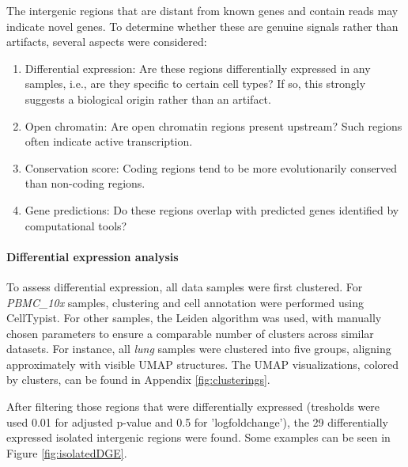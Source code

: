 The intergenic regions that are distant from known genes and contain reads may indicate novel genes.
To determine whether these are genuine signals rather than artifacts, several aspects were considered:
\begin{enumerate}
  \item Differential expression: Are these regions differentially expressed in any samples, i.e., are they specific to certain cell types?
  If so, this strongly suggests a biological origin rather than an artifact.
  \item Open chromatin: Are open chromatin regions present upstream? Such regions often indicate active transcription.
  \item Conservation score: Coding regions tend to be more evolutionarily conserved than non-coding regions.
  \item Gene predictions: Do these regions overlap with predicted genes identified by computational tools?
\end{enumerate}

\paragraph{Differential expression analysis}

To assess differential expression, all data samples were first clustered.
For \textit{PBMC\_10x} samples, clustering and cell annotation were performed using CellTypist.
For other samples, the Leiden algorithm was used, with manually chosen parameters to ensure a comparable number of clusters across similar datasets.
For instance, all \textit{lung} samples were clustered into five groups, aligning approximately with visible UMAP structures.
The UMAP visualizations, colored by clusters, can be found in Appendix \ref{fig:clusterings}.

After filtering those regions that were differentially expressed (tresholds were used 0.01 for adjusted p-value and 0.5 for 'logfoldchange'),
the 29 differentially expressed isolated intergenic regions were found.
Some examples can be seen in Figure \ref{fig:isolatedDGE}.

